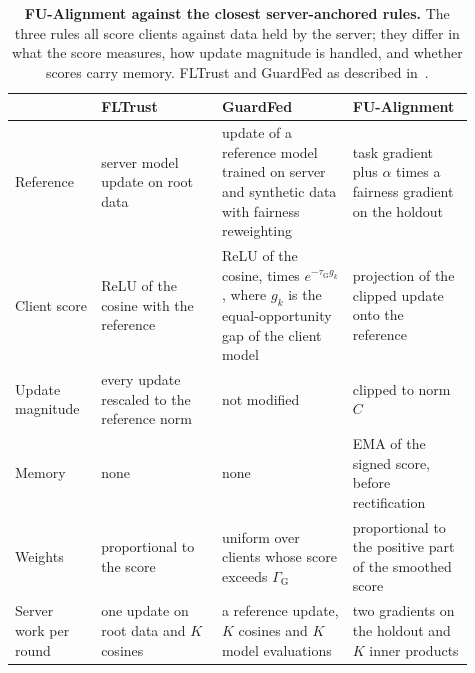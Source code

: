 \begin{table}[t]
\centering
\footnotesize
\caption{\textbf{FU-Alignment against the closest server-anchored rules.} The three rules all score clients against data held by the server; they differ in what the score measures, how update magnitude is handled, and whether scores carry memory. FLTrust and GuardFed as described in~\citep{cao2021fltrust, li2025guardfed}.}
\label{tab:rule_comparison}
\setlength{\tabcolsep}{4pt}
\begin{tabular}{p{0.17\linewidth}p{0.24\linewidth}p{0.26\linewidth}p{0.24\linewidth}}
\toprule
 & \textbf{FLTrust} & \textbf{GuardFed} & \textbf{FU-Alignment} \\
\midrule
Reference & server model update on root data & update of a reference model trained on server and synthetic data with fairness reweighting & task gradient plus $\alpha$ times a fairness gradient on the holdout \\
Client score & ReLU of the cosine with the reference & ReLU of the cosine, times $e^{-\tau_{\mathrm{G}} g_k}$, where $g_k$ is the equal-opportunity gap of the client model & projection of the clipped update onto the reference \\
Update magnitude & every update rescaled to the reference norm & not modified & clipped to norm $C$ \\
Memory & none & none & EMA of the signed score, before rectification \\
Weights & proportional to the score & uniform over clients whose score exceeds $\Gamma_{\mathrm{G}}$ & proportional to the positive part of the smoothed score \\
Server work per round & one update on root data and $K$ cosines & a reference update, $K$ cosines and $K$ model evaluations & two gradients on the holdout and $K$ inner products \\
\bottomrule
\end{tabular}
\end{table}

